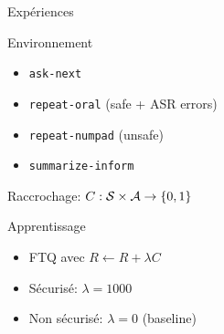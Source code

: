 \documentclass[french,handout]{beamer}
\begin{document}
    \begin{frame}{Expériences}

        \begin{block}{Environnement}
            \begin{itemize}
                \item \texttt{ask-next}%
                \item \texttt{repeat-oral} (safe + ASR errors)%
                \item \texttt{repeat-numpad} (unsafe)%
                \item \texttt{summarize-inform}
            \end{itemize}

            Raccrochage: $C: \mathcal{S}\times\mathcal{A} \rightarrow \{0,1\}$

        \end{block}

        \begin{block}{Apprentissage}
            \begin{itemize}
                \item FTQ avec $R \leftarrow R + \lambda C$
                \item Sécurisé: $\lambda = 1000$
                \item Non sécurisé: $\lambda = 0$ (baseline)
            \end{itemize}
        \end{block}


    \end{frame}
\end{document}
